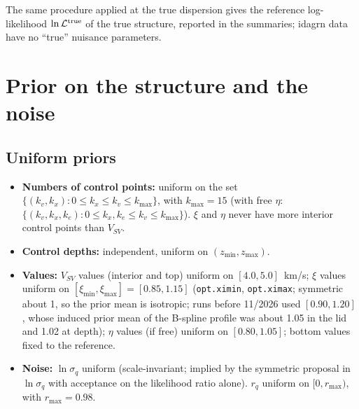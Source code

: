 \documentclass[11pt]{article}
\newcommand{\vsv}{V_{SV}}
\begin{document}
The same procedure applied at the true dispersion gives the reference
log-likelihood $\ln\mathcal{L}^{\rm true}$ of the true structure, reported
in the summaries; idagrn data have no ``true'' nuisance parameters.

\section{Prior on the structure and the noise}\label{sec:prior}

\subsection{Uniform priors}
\begin{itemize}
\item \textbf{Numbers of control points:} uniform on the set
  $\{(k_v,k_x):0\le k_x\le k_v\le k_{\max}\}$, with $k_{\max}=15$
  (with free $\eta$: $\{(k_v,k_x,k_e):0\le k_x,k_e\le k_v\le k_{\max}\}$).
  $\xi$ and $\eta$ never have more interior control points than $\vsv$.
\item \textbf{Control depths:} independent, uniform on $(z_{\min},z_{\max})$.
\item \textbf{Values:} $\vsv$ values (interior and top) uniform on
  $[4.0,5.0]$~km/s; $\xi$ values uniform on $[\xi_{\min},\xi_{\max}]=[0.85,1.15]$
  (\texttt{opt.ximin}, \texttt{opt.ximax}; symmetric about 1, so the prior
  mean is isotropic; runs before 11/2026 used $[0.90,1.20]$, whose induced
  prior mean of the B-spline profile was about 1.05 in the lid and 1.02 at
  depth); $\eta$ values (if free) uniform on $[0.80,1.05]$; bottom values
  fixed to the reference.
\item \textbf{Noise:} $\ln\sigma_q$ uniform (scale-invariant; implied by
  the symmetric proposal in $\ln\sigma_q$ with acceptance on the
  likelihood ratio alone). $r_q$ uniform on $[0,r_{\max})$, with $r_{\max}=0.98$.
\end{itemize}
\end{document}
